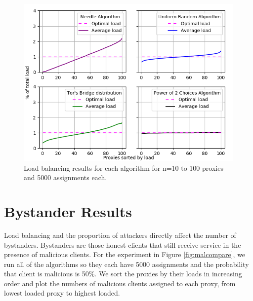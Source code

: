 \begin{figure}[h!]
\centering
     \includegraphics[width=1.0\textwidth]{fig/load_balance_comparison_to_5000_100.png}
    \caption{Load balancing results for each algorithm for n=10 to 100 proxies and 5000 assignments each.}

    \label{fig:lbcomp}
\end{figure}


\section{Bystander Results}
\label{sec:bystandereval}

Load balancing and the proportion of attackers directly affect the number of bystanders. Bystanders are those honest clients that still receive service in the presence of malicious clients. For the experiment in Figure \ref{fig:malcompare}, we run all of the algorithms so they each have 5000 assignments and the probability that client is malicious is 50\%. We sort the proxies by their loads in increasing order and plot the numbers of malicious clients assigned to each proxy, from lowest loaded proxy to highest loaded.

